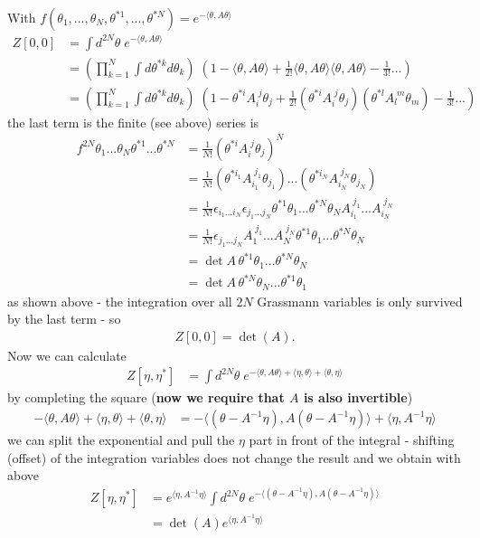 \documentclass[10pt,a4paper]{article}
\theoremstyle{definition}
\begin{document}
\begin{enumerate}
With $f(\theta_1,...,\theta_N,\theta^{*1},...,\theta^{*N})=e^{-\langle\theta,A\theta\rangle}$
\begin{align}
Z[0,0]&=\int d^{2N}\theta \; e^{-\langle\theta,A\theta\rangle}\\
&=\left(\prod_{k=1}^N\int d\theta^{*k}d\theta_k\right)\; \left(
1
-\langle\theta,A\theta\rangle
+\frac{1}{2!}\langle\theta,A\theta\rangle\langle\theta,A\theta\rangle
-\frac{1}{3!}...\right)\\
&=\left(\prod_{k=1}^N\int d\theta^{*k}d\theta_k\right)\; \left(
1
-\theta^{*i}A_i^{\;j}\theta_j
+\frac{1}{2!}(\theta^{*i}A_i^{\;j}\theta_j)(\theta^{*l}A_l^{\;m}\theta_m)
-\frac{1}{3!}...\right)
\end{align}
the last term is the finite (see above) series is
\begin{align}
f^{2N}\theta_1...\theta_N\theta^{*1}...\theta^{*N}
&=\frac{1}{N!}(\theta^{*i}A_i^{\;j}\theta_j)^N\\
&=\frac{1}{N!}(\theta^{*{i_1}}A_{i_1}^{\;{j_1}}\theta_{j_1})...(\theta^{*{i_N}}A_{i_N}^{\;{j_N}}\theta_{j_N})\\
&=\frac{1}{N!}\epsilon_{i_1...i_N}\epsilon_{j_1...j_N}
\theta^{*1}\theta_1...\theta^{*N}\theta_N A_{i_1}^{\;{j_1}}...A_{i_N}^{\;j_N}\\
&=\frac{1}{N!}\epsilon_{j_1...j_N}A_{1}^{\;{j_1}}...A_{N}^{\;j_N}
\theta^{*1}\theta_1...\theta^{*N}\theta_N \\
&=\det A\, \theta^{*1}\theta_1...\theta^{*N}\theta_N\\
&=\det A\, \theta^{*N}\theta_N...\theta^{*1}\theta_1
\end{align}
as shown above - the integration over all $2N$ Grassmann variables is only survived by the last term - so
\begin{align}
Z[0,0]=\det(A).
\end{align}
Now we can calculate
\begin{align}
Z[\eta,\eta^*]
&=\int d^{2N}\theta \; e^{-\langle\theta,A\theta\rangle+\langle\eta,\theta\rangle+\langle\theta,\eta\rangle}
\end{align}
by completing the square ({\bf now we require that $A$ is also invertible})
\begin{align}
-\langle\theta,A\theta\rangle+\langle\eta,\theta\rangle+\langle\theta,\eta\rangle
&=-\langle(\theta-A^{-1}\eta),A(\theta-A^{-1}\eta)\rangle+\langle\eta,A^{-1}\eta\rangle
\end{align}
we can split the exponential and pull the $\eta$ part in front of the integral - shifting (offset) of the integration variables does not change the result and we obtain with above
\begin{align}
Z[\eta,\eta^*]
&=e^{\langle\eta,A^{-1}\eta\rangle}\int d^{2N}\theta \; e^{-\langle(\theta-A^{-1}\eta),A(\theta-A^{-1}\eta)\rangle}\\
&=\det(A)e^{\langle\eta,A^{-1}\eta\rangle}
\end{align}


\end{enumerate}
\end{document}
